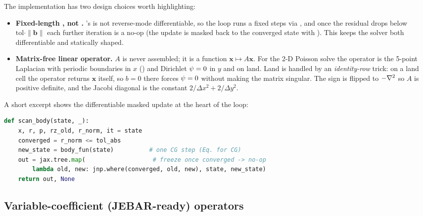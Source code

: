 The implementation has two design choices worth highlighting:
\begin{itemize}
\item \textbf{Fixed-length , not .} \jax's
 is not reverse-mode differentiable, so the loop runs a fixed
 steps via , and once the residual drops below
$\mathrm{tol}\cdot\|\mathbf{b}\|$ each further iteration is a no-op (the update is
masked back to the converged state with ). This keeps the solver
both differentiable and statically shaped.
\item \textbf{Matrix-free linear operator.} $A$ is never assembled; it is a function
$\mathbf{x}\mapsto A\mathbf{x}$. For the 2-D Poisson solve the operator is the
5-point Laplacian with periodic boundaries in $x$ () and Dirichlet
$\psi=0$ in $y$ and on land. Land is handled by an \emph{identity-row} trick: on a
land cell the operator returns $\mathbf{x}$ itself, so $b=0$ there forces $\psi=0$
without making the matrix singular. The sign is flipped to $-\nabla^{2}$ so $A$ is positive
definite, and the Jacobi diagonal is the constant $2/\Delta x^2 + 2/\Delta y^2$.
\end{itemize}
A short excerpt shows the differentiable masked update at the heart of the loop:
\begin{lstlisting}[language=Python]
def scan_body(state, _):
    x, r, p, rz_old, r_norm, it = state
    converged = r_norm <= tol_abs
    new_state = body_fun(state)          # one CG step (Eq. for CG)
    out = jax.tree.map(                   # freeze once converged -> no-op
        lambda old, new: jnp.where(converged, old, new), state, new_state)
    return out, None
\end{lstlisting}

\subsection{Variable-coefficient (JEBAR-ready) operators}\label{sec:varcoef}

